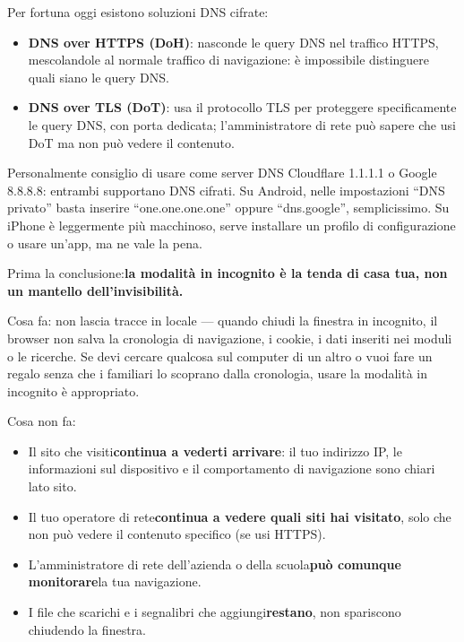 Per fortuna oggi esistono soluzioni DNS cifrate:

\begin{itemize}
  \item \textbf{DNS over HTTPS (DoH)}: nasconde le query DNS nel traffico HTTPS, mescolandole al normale traffico di navigazione: è impossibile distinguere quali siano le query DNS.
  \item \textbf{DNS over TLS (DoT)}: usa il protocollo TLS per proteggere specificamente le query DNS, con porta dedicata; l'amministratore di rete può sapere che usi DoT ma non può vedere il contenuto.
\end{itemize}

Personalmente consiglio di usare come server DNS Cloudflare 1.1.1.1 o Google 8.8.8.8: entrambi supportano DNS cifrati. Su Android, nelle impostazioni “DNS privato” basta inserire “one.one.one.one” oppure “dns.google”, semplicissimo. Su iPhone è leggermente più macchinoso, serve installare un profilo di configurazione o usare un'app, ma ne vale la pena.


Prima la conclusione:\textbf{la modalità in incognito è la tenda di casa tua, non un mantello dell'invisibilità.}

Cosa fa: non lascia tracce in locale — quando chiudi la finestra in incognito, il browser non salva la cronologia di navigazione, i cookie, i dati inseriti nei moduli o le ricerche. Se devi cercare qualcosa sul computer di un altro o vuoi fare un regalo senza che i familiari lo scoprano dalla cronologia, usare la modalità in incognito è appropriato.

Cosa non fa:

\begin{itemize}
  \item Il sito che visiti\textbf{continua a vederti arrivare}: il tuo indirizzo IP, le informazioni sul dispositivo e il comportamento di navigazione sono chiari lato sito.
  \item Il tuo operatore di rete\textbf{continua a vedere quali siti hai visitato}, solo che non può vedere il contenuto specifico (se usi HTTPS).
  \item L'amministratore di rete dell'azienda o della scuola\textbf{può comunque monitorare}la tua navigazione.
  \item I file che scarichi e i segnalibri che aggiungi\textbf{restano}, non spariscono chiudendo la finestra.
\end{itemize}

